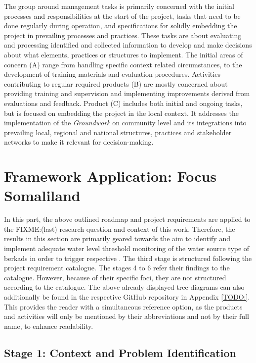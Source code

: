 The group around management tasks is primarily concerned with the initial processes and responsibilities at the start of the project, tasks that need to be done regularly during operation, and specifications for solidly embedding the project in prevailing processes and practices. These tasks are about evaluating and processing identified and collected information to develop and make decisions about what elements, practices or structures to implement. The initial areas of concern (A) range from handling specific context related circumstances, to the development of training materials and evaluation procedures. Activities contributing to regular required products (B) are mostly concerned about providing training and supervision and implementing improvements derived from evaluations and feedback. Product (C) includes both initial and ongoing tasks, but is focused on embedding the project in the local context. It addresses the implementation of the \textit{Groundwork} on community level and its integrations into prevailing local, regional and national structures, practices and stakeholder networks to make it relevant for decision-making.



\section{Framework Application: Focus Somaliland}

In this part, the above outlined roadmap and project requirements are applied to the FIXME:(last) research question and context of this work. Therefore, the results in this section are primarily geared towards the aim to identify and implement adequate water level threshold monitoring of the water source type of berkads in order to trigger respective . The third stage is structured following the project requirement catalogue. The stages 4 to 6 refer their findings to the catalogue. However, because of their specific foci, they are not structured according to the catalogue. The above already displayed tree-diagrams can also additionally be found in the respective GitHub repository in Appendix \ref*{TODO:}. This provides the reader with a simultaneous reference option, as the products and activities will only be mentioned by their abbreviations and not by their full name, to enhance readability.

\subsection{Stage 1: Context and Problem Identification}\label{subsec:stage1_appl}

